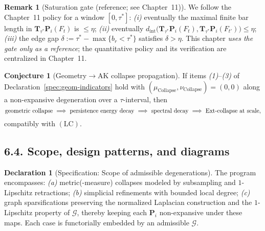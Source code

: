 \documentclass[11pt]{article}
\numberwithin{equation}{section}
\theoremstyle{plain}
\theoremstyle{definition}
\theoremstyle{remark}
\DeclareMathOperator{\Ext}{Ext}
\DeclareRobustCommand{\hyp}{\nobreakdash-}
\theoremstyle{plain}
\theoremstyle{definition}
\numberwithin{equation}{section}
\newtheorem{conjecture}{Conjecture}[section]
\theoremstyle{definition}
\newtheorem{remark}[theorem]{Remark}
\newtheorem{declaration}[theorem]{Declaration}
\DeclareRobustCommand{\muc}{\mu_{\mathrm{Collapse}}}
\DeclareRobustCommand{\nuc}{\nu_{\mathrm{Collapse}}}
\DeclareRobustCommand{\LC}{\texorpdfstring{\ensuremath{\mathrm{(LC)}}}{(LC)}}
\numberwithin{equation}{section}
\theoremstyle{plain}
\theoremstyle{definition}
\theoremstyle{remark}
\providecommand{\muc}{\mu_{\mathrm{Collapse}}}
\providecommand{\nuc}{\nu_{\mathrm{Collapse}}}
\begin{document}
\begin{remark}[Saturation gate (reference; see Chapter~11)]\label{rk:sat-gate-ch6}
We follow the Chapter~11 policy for a window \([0,\tau^\ast]\): \emph{(i)} eventually the maximal finite bar length in \(\mathbf{T}_{\tau^\ast}\mathbf{P}_i(F_t)\) is \(\le \eta\); \emph{(ii)} eventually \(d_{\mathrm{int}}\!\big(\mathbf{T}_{\tau^\ast}\mathbf{P}_i(F_t),\mathbf{T}_{\tau^\ast}\mathbf{P}_i(F_{t'})\big)\le \eta\); \emph{(iii)} the edge gap \(\delta:=\tau^\ast-\max\{b_r<\tau^\ast\}\) satisfies \(\delta>\eta\).
This chapter \emph{uses the gate only as a reference}; the quantitative policy and its verification are centralized in Chapter~11.
\end{remark}

\begin{conjecture}[Geometry\texorpdfstring{$\to$}{->}AK collapse propagation]\label{conj:geom-prop}
If items \emph{(1)}–\emph{(3)} of Declaration~\ref{spec:geom-indicators} hold with \((\muc,\nuc)=(0,0)\) along a non\hyp expansive degeneration over a \(\tau\)\hyp interval, then
\[
  \text{geometric collapse}\ \Longrightarrow\ \text{persistence\ energy\ decay}\ \Longrightarrow\ \text{spectral decay}\ \Longrightarrow\ \text{\(\Ext\)\hyp collapse at scale},
\]
compatibly with \LC.
\end{conjecture}

\subsection*{6.4. Scope, design patterns, and diagrams}
\begin{declaration}[Specification: Scope of admissible degenerations]\label{spec:scope}
The program encompasses: \emph{(a)} metric(\hyp measure) collapses modeled by subsampling and \(1\)\hyp Lipschitz retractions; \emph{(b)} simplicial refinements with bounded local degree; \emph{(c)} graph sparsifications preserving the normalized Laplacian construction and the \(1\)\hyp Lipschitz property of \(\mathcal{G}\), thereby keeping each \(\mathbf{P}_i\) non\hyp expansive under these maps.
Each case is functorially embedded by an admissible \(\mathcal{G}\).
\end{declaration}
\end{document}
